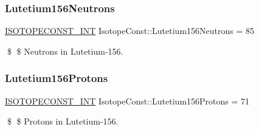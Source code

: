 \subsubsection{\texorpdfstring{Lutetium156\+Neutrons}{Lutetium156Neutrons}}
{\footnotesize\ttfamily \mbox{\hyperlink{group___isotope_const-_macros_ga5f18360b3e99483a35c32d789e62621c}{I\+S\+O\+T\+O\+P\+E\+C\+O\+N\+S\+T\+\_\+\+I\+NT}} Isotope\+Const\+::\+Lutetium156\+Neutrons = 85}

\$ \$ Neutrons in Lutetium-\/156. \mbox{\label{group___isotope_const-_lutetium-_lu156_ga9159b4423b3970e76d4efdbf058352f0}} 
\subsubsection{\texorpdfstring{Lutetium156\+Protons}{Lutetium156Protons}}
{\footnotesize\ttfamily \mbox{\hyperlink{group___isotope_const-_macros_ga5f18360b3e99483a35c32d789e62621c}{I\+S\+O\+T\+O\+P\+E\+C\+O\+N\+S\+T\+\_\+\+I\+NT}} Isotope\+Const\+::\+Lutetium156\+Protons = 71}

\$ \$ Protons in Lutetium-\/156. 